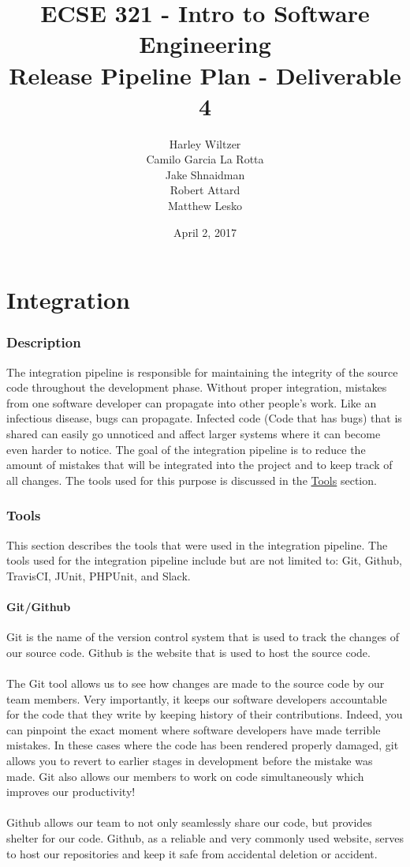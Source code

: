 \documentclass[12pt]{report}
\title{ECSE 321 - Intro to Software Engineering\\Release Pipeline Plan - Deliverable 4}
\author{Harley Wiltzer\\Camilo Garcia La Rotta\\Jake Shnaidman\\Robert Attard\\Matthew Lesko}
\date{April 2, 2017}
\begin{document}
\maketitle
\newpage
{} %
\tableofcontents
\part{Integration}
\section{Description}
The integration pipeline is responsible for maintaining the integrity of the source code throughout the development phase. Without proper integration, mistakes from one software developer can propagate into other people's work. Like an infectious disease, bugs can propagate. Infected code (Code that has bugs) that is shared can easily go unnoticed and affect larger systems where it can become even harder to notice. The goal of the integration pipeline is to reduce the amount of mistakes that will be integrated into the project and to keep track of all changes. The tools used for this purpose is discussed in the \hyperref[s:integration-tools]{Tools} section.
\section{Tools}
\label{s:integration-tools}
This section describes the tools that were used in the integration pipeline. The tools used for the integration pipeline include but are not limited to: Git, Github, TravisCI, JUnit, PHPUnit, and Slack.

\subsection{Git/Github}
Git is the name of the version control system that is used to track the changes of our source code. Github is the website that is used to host the source code. \\\\
The Git tool allows us to see how changes are made to the source code by our team members. Very importantly, it keeps our software developers accountable for the code that they write by keeping history of their contributions. Indeed, you can pinpoint the exact moment where software developers have made terrible mistakes. In these cases where the code has been rendered properly damaged, git allows you to revert to earlier stages in development before the mistake was made. Git also allows our members to work on code simultaneously which improves our productivity!\\\\
Github allows our team to not only seamlessly share our code, but provides shelter for our code. Github, as a reliable  and very commonly used website, serves to host our repositories and keep it safe from accidental deletion or accident.
\end{document}
